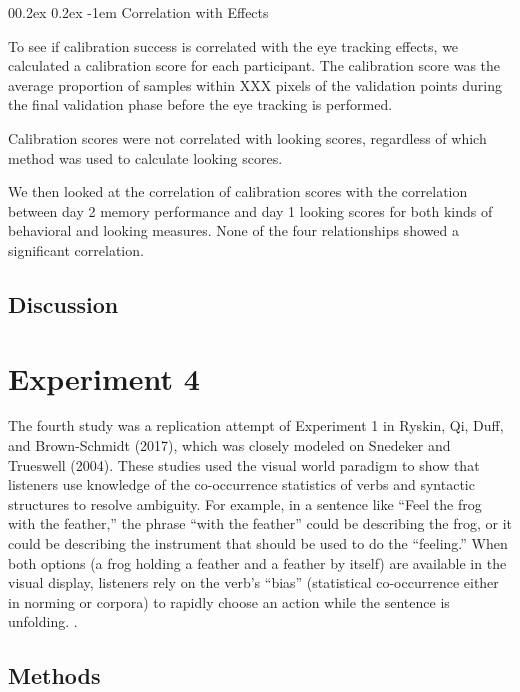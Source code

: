 \documentclass[
  man,floatsintext]{apa6}
\makeatletter
\let\oldparagraph\paragraph
\renewcommand{\paragraph}[1]{\oldparagraph{#1}\mbox{}}
\renewcommand{\paragraph}{\@startsection{paragraph}{4}{\parindent}%
  {0\baselineskip \@plus 0.2ex \@minus 0.2ex}%
  {-1em}%
  {\normalfont\normalsize\bfseries\itshape\typesectitle}}
\makeatother
\begin{document}
\hypertarget{correlation-with-effects}{%
\paragraph{Correlation with Effects}\label{correlation-with-effects}}

To see if calibration success is correlated with the eye tracking effects, we calculated a calibration score for each participant. The calibration score was the average proportion of samples within XXX pixels of the validation points during the final validation phase before the eye tracking is performed.

Calibration scores were not correlated with looking scores, regardless of which method was used to calculate looking scores.

We then looked at the correlation of calibration scores with the correlation between day 2 memory performance and day 1 looking scores for both kinds of behavioral and looking measures. None of the four relationships showed a significant correlation.

\hypertarget{discussion-2}{%
\subsection{Discussion}\label{discussion-2}}

\hypertarget{experiment-4}{%
\section{Experiment 4}\label{experiment-4}}

The fourth study was a replication attempt of Experiment 1 in
Ryskin, Qi, Duff, and Brown-Schmidt (2017), which was closely modeled on
Snedeker and Trueswell (2004). These studies used the
visual world paradigm to show that listeners use knowledge of the
co-occurrence statistics of verbs and syntactic structures to resolve
ambiguity. For example, in a sentence like ``Feel the frog with the
feather,'' the phrase ``with the feather'' could be describing the frog, or
it could be describing the instrument that should be used to do the
``feeling.'' When both options (a frog holding a feather and a feather by
itself) are available in the visual display, listeners rely on the
verb's ``bias'' (statistical co-occurrence either in norming or corpora)
to rapidly choose an action while the sentence is unfolding. .

\hypertarget{methods-3}{%
\subsection{Methods}\label{methods-3}}
\end{document}
